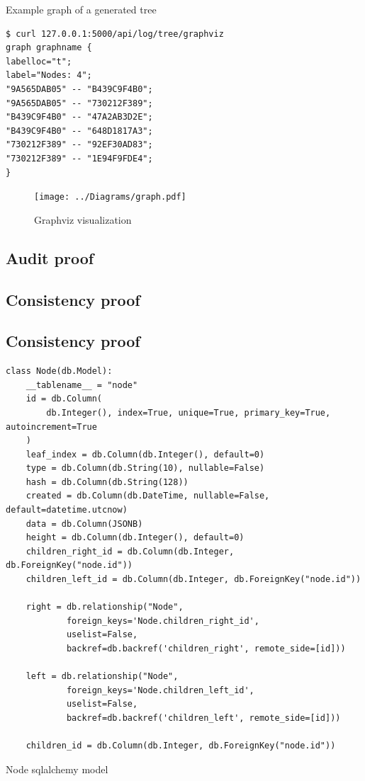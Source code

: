 \documentclass[../Main/thesis.tex]{subfiles}
\begin{document}
\begin{listing}[htpb]
\caption{Example graph of a generated tree}
\label{lst:graphviz-test}
\begin{verbatim}
$ curl 127.0.0.1:5000/api/log/tree/graphviz                        
graph graphname {
labelloc="t";
label="Nodes: 4";
"9A565DAB05" -- "B439C9F4B0";
"9A565DAB05" -- "730212F389";
"B439C9F4B0" -- "47A2AB3D2E";
"B439C9F4B0" -- "648D1817A3";
"730212F389" -- "92EF30AD83";
"730212F389" -- "1E94F9FDE4";
}
\end{verbatim}
\end{listing}

\begin{figure}[htpb]
\centering
\texttt{[image: ../Diagrams/graph.pdf]}
\caption{Graphviz visualization}
\label{fig:graphviz_pdf}
\end{figure}

\subsection*{Audit proof}%
\label{sub:audit_proof_implementation}

\subsection*{Consistency proof}%
\label{sub:consistency_proof_implementation}

\subsection*{Consistency proof}%
\label{sub:consistency_proof_implementation}

\begin{listing}[H]
\begin{verbatim}
class Node(db.Model):
    __tablename__ = "node"
    id = db.Column(
        db.Integer(), index=True, unique=True, primary_key=True, autoincrement=True
    )
    leaf_index = db.Column(db.Integer(), default=0)
    type = db.Column(db.String(10), nullable=False)
    hash = db.Column(db.String(128))
    created = db.Column(db.DateTime, nullable=False, default=datetime.utcnow)
    data = db.Column(JSONB)
    height = db.Column(db.Integer(), default=0)
    children_right_id = db.Column(db.Integer, db.ForeignKey("node.id"))
    children_left_id = db.Column(db.Integer, db.ForeignKey("node.id"))

    right = db.relationship("Node",
            foreign_keys='Node.children_right_id',
            uselist=False,
            backref=db.backref('children_right', remote_side=[id]))

    left = db.relationship("Node", 
            foreign_keys='Node.children_left_id',
            uselist=False,
            backref=db.backref('children_left', remote_side=[id]))

    children_id = db.Column(db.Integer, db.ForeignKey("node.id"))
\end{verbatim}
\caption{Node sqlalchemy model}
\label{lst:node_model}
\end{listing}
\end{document}
